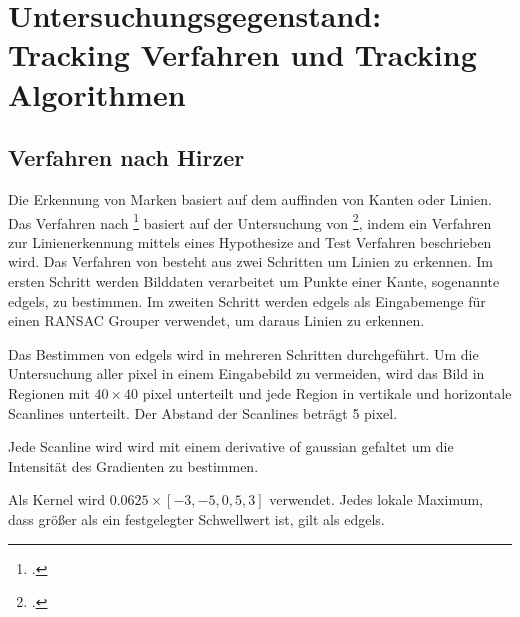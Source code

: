 \section{Untersuchungsgegenstand: Tracking Verfahren und Tracking Algorithmen} %
\label{sec:untersuchungsgegenstand}
\begin{comment}
	Untersuchungsgegenstand: Verfahren und Algorithmen präzise vorstellen und ihre Unterschiede hervorheben.
	Notwendige Kriterien der Algorithmen bestimmen

	Grober Ablauf der Verfahren - Wer hats erfunden? Welche Kriterien müssen erfüllt sein (monochrome, rgb eingabe)? Wie ist das Verfahren aufgebaut (Algo in grob)
	Detailierte Beschreibung der Algorithmen inkl. O-Notation (Nitty-Gritty Darstellung des Algos)
	1. ARToolKit
	2. ARToolKitPlus
	3. Zissermann/Clarke
\end{comment}

\subsection{Verfahren nach Hirzer} %
\label{sub:verfahren_nach_hirzer}

Die Erkennung von Marken basiert auf dem auffinden von Kanten oder Linien. Das Verfahren nach \citeauthor{hirzer08}\footcite{hirzer08} basiert auf der Untersuchung von \citeauthor{clarke96}\footcite{clarke96}, indem ein Verfahren zur Linienerkennung mittels eines Hypothesize and Test Verfahren beschrieben wird. Das Verfahren von \citeauthor{clarke96} besteht aus zwei Schritten um Linien zu erkennen. Im ersten Schritt werden Bilddaten verarbeitet um Punkte einer Kante, sogenannte \gls{edgels}, zu bestimmen. Im zweiten Schritt werden \gls{edgels} als Eingabemenge für einen RANSAC Grouper verwendet, um daraus Linien zu erkennen.



Das Bestimmen von \gls{edgels} wird in mehreren Schritten durchgeführt. Um die Untersuchung aller \gls{pixel} in einem Eingabebild zu vermeiden, wird das Bild in Regionen mit $40 \times 40$ \gls{pixel} unterteilt und jede Region in vertikale und horizontale Scanlines unterteilt. Der Abstand der Scanlines beträgt 5 \gls{pixel}.

Jede Scanline wird wird mit einem derivative of gaussian gefaltet um die Intensität des Gradienten zu bestimmen.
\begin{comment}
	Ist Intensity Gradient = Intensität des Gradienten?
\end{comment}
Als Kernel wird $0.0625 \times \left[-3,-5,0,5,3\right]$ verwendet. Jedes lokale Maximum, dass größer als ein festgelegter Schwellwert ist, gilt als \gls{edgels}.

